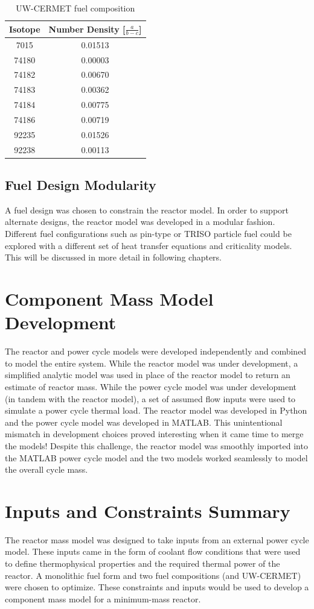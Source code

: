 \begin{table}[h]
  \centering
  \caption{UW-CERMET fuel composition}
  \begin{tabular}{cc}
    \toprule
    Isotope   & Number Density [$\frac{a}{b-c}$] \\
    \midrule
    7015	&	0.01513	\\
    74180	&	0.00003	\\
    74182	&	0.00670	\\
    74183	&	0.00362	\\
    74184	&	0.00775	\\
    74186	&	0.00719	\\
    92235	&	0.01526	\\
    92238	&	0.00113	\\
  \end{tabular}
  \label{tab:uw_comp}
\end{table}

\newpage

\subsection{Fuel Design Modularity}
A fuel design was chosen to constrain the reactor model. In order to support
alternate designs, the reactor model was developed in a modular fashion.
Different fuel configurations such as pin-type or TRISO particle fuel could be
explored with a different set of heat transfer equations and criticality models.
This will be discussed in more detail in following chapters.

\section{Component Mass Model Development}
The reactor and power cycle models were developed independently and combined
to model the entire system. While the reactor model
was under development, a simplified analytic model was used in place of the
reactor model to return an estimate of reactor mass. While the power cycle model
was under development (in tandem with the reactor model), a set of assumed flow
inputs were used to simulate a power cycle thermal load. The reactor model was
developed in Python and the power cycle model was developed in MATLAB. This
unintentional mismatch in development choices proved interesting when it came
time to merge the models! Despite this challenge, the reactor model was smoothly
imported into the MATLAB power cycle model and the two models worked seamlessly
to model the overall cycle mass.

\section{Inputs and Constraints Summary}
The reactor mass model was designed to take inputs from an external power cycle
model. These inputs came in the form of coolant flow conditions that were used
to define thermophysical properties and the required thermal power of the
reactor. A monolithic fuel form and two fuel compositions (\uox and UW-CERMET)
were chosen to optimize. These constraints and inputs would be used to develop a
component mass model for a minimum-mass reactor.
